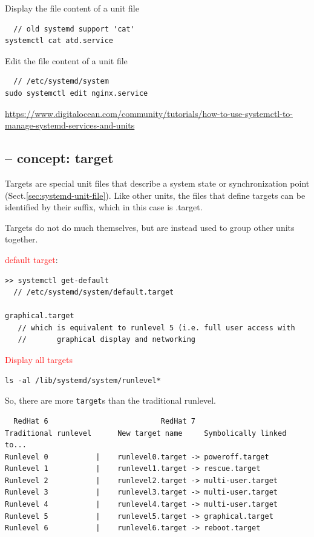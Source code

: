 Display the file content of a unit file
\begin{verbatim}
  // old systemd support 'cat' 
systemctl cat atd.service
\end{verbatim}


Edit the file content of a unit file
\begin{verbatim}
  // /etc/systemd/system
sudo systemctl edit nginx.service
\end{verbatim}

\url{https://www.digitalocean.com/community/tutorials/how-to-use-systemctl-to-manage-systemd-services-and-units}

\subsection{-- concept: target}
\label{sec:systemd-target}

Targets are special unit files that describe a system state or synchronization
point (Sect.\ref{sec:systemd-unit-file}).
Like other units, the files that define targets can be identified by their
suffix, which in this case is .target.

Targets do not do much themselves, but are instead used to group other units
together.

\textcolor{red}{default target}:
\begin{verbatim}
>> systemctl get-default
  // /etc/systemd/system/default.target

graphical.target 
   // which is equivalent to runlevel 5 (i.e. full user access with 
   //       graphical display and networking

\end{verbatim}

\textcolor{red}{Display all targets}
\begin{verbatim}
ls -al /lib/systemd/system/runlevel*
\end{verbatim}

So, there are more \verb!target!s than the traditional runlevel.
\begin{verbatim}
  RedHat 6                          RedHat 7
Traditional runlevel      New target name     Symbolically linked to...
Runlevel 0           |    runlevel0.target -> poweroff.target
Runlevel 1           |    runlevel1.target -> rescue.target
Runlevel 2           |    runlevel2.target -> multi-user.target
Runlevel 3           |    runlevel3.target -> multi-user.target
Runlevel 4           |    runlevel4.target -> multi-user.target
Runlevel 5           |    runlevel5.target -> graphical.target
Runlevel 6           |    runlevel6.target -> reboot.target
\end{verbatim}  


